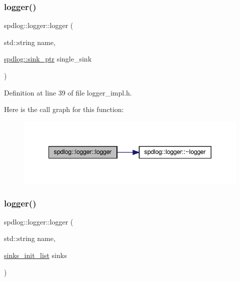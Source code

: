 \subsubsection{\texorpdfstring{logger()}{logger()}\hspace{0.1cm}{\footnotesize\ttfamily [1/4]}}
{\footnotesize\ttfamily spdlog\+::logger\+::logger (\begin{DoxyParamCaption}\item[{std\+::string}]{name,  }\item[{\hyperlink{namespacespdlog_a422c57d3088160b517e5a74e5f318253}{spdlog\+::sink\+\_\+ptr}}]{single\+\_\+sink }\end{DoxyParamCaption})\hspace{0.3cm}{\ttfamily [inline]}}



Definition at line 39 of file logger\+\_\+impl.\+h.

Here is the call graph for this function\+:
\nopagebreak
\begin{figure}[H]
\begin{center}
\leavevmode
\includegraphics[width=342pt]{classspdlog_1_1logger_a5d3b321a0319e9b8b27bf04f206a9900_cgraph}
\end{center}
\end{figure}
\mbox{\label{classspdlog_1_1logger_af1f2f69f6bbbe9eb23cf428d66d20f70}} 
\subsubsection{\texorpdfstring{logger()}{logger()}\hspace{0.1cm}{\footnotesize\ttfamily [2/4]}}
{\footnotesize\ttfamily spdlog\+::logger\+::logger (\begin{DoxyParamCaption}\item[{std\+::string}]{name,  }\item[{\hyperlink{namespacespdlog_aa9b5c2298bf713fbe02b7e538d797ecd}{sinks\+\_\+init\+\_\+list}}]{sinks }\end{DoxyParamCaption})\hspace{0.3cm}{\ttfamily [inline]}}



